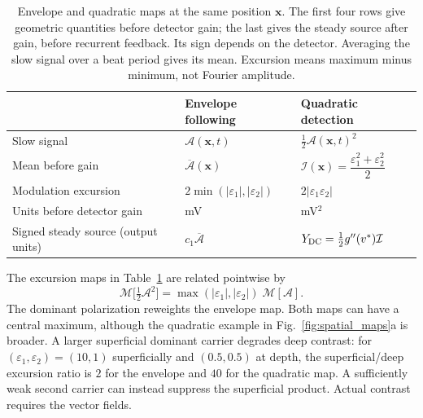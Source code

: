 \begin{table}[ht]
\centering\small
\renewcommand{\arraystretch}{1.4}
\begin{tabular}{@{}>{\raggedright\arraybackslash}p{}
 >{\raggedright\arraybackslash}p{}
 >{\raggedright\arraybackslash}p{}@{}}
\toprule
 & Envelope following & Quadratic detection \\
\midrule
Slow signal & $\mathcal A(\mathbf x,t)$ & $\tfrac12\mathcal A(\mathbf x,t)^2$ \\
Mean before gain & $\overline{\mathcal A}(\mathbf x)$
 & $\mathcal I(\mathbf x)=\dfrac{\varepsilon_1^2+\varepsilon_2^2}{2}$ \\
Modulation excursion & $2\min(|\varepsilon_1|,|\varepsilon_2|)$
 & $2|\varepsilon_1\varepsilon_2|$ \\
Units before detector gain & mV & mV$^2$ \\
Signed steady source (output units) & $c_1\overline{\mathcal A}$
 & $Y_{\rm DC}=\tfrac12g''(v^*)\mathcal I$ \\
\bottomrule
\end{tabular}
\caption{Envelope and quadratic maps at the same position $\mathbf x$.
The first four rows give geometric quantities before detector gain; the last
gives the steady source after gain, before recurrent feedback. Its sign depends
on the detector. Averaging the slow signal over a beat period gives its mean.
Excursion means maximum minus minimum, not Fourier amplitude.}
\label{tab:transduction-maps}
\end{table}

The excursion maps in Table~\ref{tab:transduction-maps} are related pointwise by
\begin{equation}
\mathcal{M}\big[\tfrac12\mathcal A^2\big]=\max(|\varepsilon_1|,|\varepsilon_2|)\;\mathcal{M}[\mathcal A].
\label{eq:reweight}
\end{equation}
The dominant polarization reweights the envelope map. Both maps can have a
central maximum, although the quadratic example in Fig.~\ref{fig:spatial_maps}a
is broader. A larger superficial dominant carrier degrades deep contrast:
for $(\varepsilon_1,\varepsilon_2)=(10,1)$ superficially and $(0.5,0.5)$
at depth, the superficial/deep excursion ratio is $2$ for the envelope
and $40$ for the quadratic map. A sufficiently weak second carrier can
instead suppress the superficial product. Actual contrast requires the vector fields.

